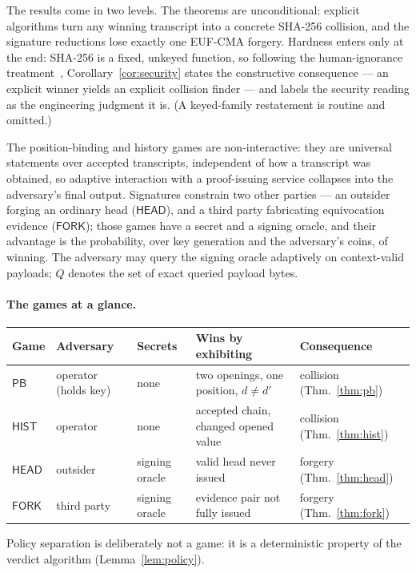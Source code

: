 \documentclass[11pt]{article}
\theoremstyle{remark}
\begin{document}
The results come in two levels. The theorems are unconditional: explicit
algorithms turn any winning transcript into a concrete SHA-256 collision,
and the signature reductions lose exactly one EUF-CMA forgery. Hardness
enters only at the end: SHA-256 is a fixed, unkeyed function, so following
the human-ignorance treatment~\cite{rogaway}, Corollary~\ref{cor:security}
states the constructive consequence --- an explicit winner yields an explicit
collision finder --- and labels the security reading as the engineering
judgment it is. (A keyed-family restatement is routine and omitted.)

The position-binding and history games are non-interactive: they are
universal statements over accepted transcripts, independent of how a
transcript was obtained, so adaptive interaction with a proof-issuing
service collapses into the adversary's final output. Signatures constrain
two other parties --- an outsider forging an ordinary head
($\mathsf{HEAD}$), and a third party fabricating equivocation evidence
($\mathsf{FORK}$); those games have a secret and a signing oracle, and their
advantage is the probability, over key generation and the adversary's coins,
of winning. The adversary may query the signing oracle adaptively on
context-valid payloads; $Q$ denotes the set of exact queried payload bytes.

\paragraph{The games at a glance.}
\begin{center}\footnotesize
\begin{tabular}{@{}lllll@{}}
\toprule
Game & Adversary & Secrets & Wins by exhibiting & Consequence \\
\midrule
$\mathsf{PB}$ & operator (holds key) & none & two openings, one position, $d\neq d'$ & collision (Thm.~\ref{thm:pb}) \\
$\mathsf{HIST}$ & operator & none & accepted chain, changed opened value & collision (Thm.~\ref{thm:hist}) \\
$\mathsf{HEAD}$ & outsider & signing oracle & valid head never issued & forgery (Thm.~\ref{thm:head}) \\
$\mathsf{FORK}$ & third party & signing oracle & evidence pair not fully issued & forgery (Thm.~\ref{thm:fork}) \\
\bottomrule
\end{tabular}
\end{center}
\noindent Policy separation is deliberately not a game: it is a deterministic
property of the verdict algorithm (Lemma~\ref{lem:policy}).
\end{document}
